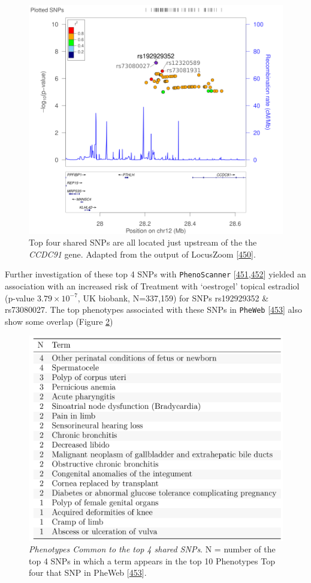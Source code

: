\documentclass[
]{book}
\begin{document}
\begin{figure}

{\centering \includegraphics[width=0.7\linewidth]{./figs/locusZoom_rs192929352_400kb} 

}

\caption{Top four shared SNPs are all located just upstream of the the \emph{CCDC91} gene. Adapted from the output of LocusZoom {[}\protect\hyperlink{ref-Pruim2011}{450}{]}.}\label{fig:locusZoom}
\end{figure}



Further investigation of these top 4 SNPs with \texttt{PhenoScanner} {[}\protect\hyperlink{ref-Staley2016}{451},\protect\hyperlink{ref-Kamat2019}{452}{]} yielded an association with an increased risk of Treatment with `oestrogel' topical estradiol (p-value \(3.79\times10^{-7}\), UK biobank, N=337,159) for SNPs rs192929352 \& rs73080027.
The top phenotypes associated with these SNPs in \texttt{PheWeb} {[}\protect\hyperlink{ref-GaglianoTaliun2020}{453}{]} also show some overlap (Figure \ref{fig:PheWebSets})

\begin{figure}

{\centering \includegraphics[width=0.5\linewidth]{./figs/PheWeb_sets} 

}

\caption{\emph{Phenotypes Common to the top 4 shared SNPs}. N = number of the top 4 SNPs in which a term appears in the top 10 Phenotypes Top four that SNP in PheWeb {[}\protect\hyperlink{ref-GaglianoTaliun2020}{453}{]}.}\label{fig:PheWebSets}
\end{figure}
\end{document}
